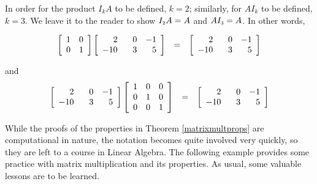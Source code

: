 In order for the product $I_{k}A$ to be defined, $k = 2$;  similarly, for $AI_{k}$ to be defined, $k = 3$.  We leave it to the reader to show $I_{\mbox{\tiny$2$}}A = A$ and $AI_{\mbox{\tiny$3$}} = A$.  In other words,


\[\begin{array}{rcl}
\left[ \begin{array}{rr} 1 & 0 \\ 0 & 1 \\ \end{array} \right] \left[\begin{array}{rrr} 2 & \hphantom{-}0 & -1 \\ -10 & 3 & 5 \\ \end{array} \right] & = & \left[\begin{array}{rrr} 2 & \hphantom{-}0 & -1 \\ -10 & 3 & 5 \\ \end{array} \right] \\ \end{array}\]

and
\[\begin{array}{rcl}
\left[\begin{array}{rrr} 2 & \hphantom{-}0 & -1 \\ -10 & 3 & 5 \\ \end{array} \right]\left[ \begin{array}{rrr} 1 & 0 & 0 \\ 0 & 1 & 0 \\ 0 & 0 & 1 \\ \end{array} \right] & = & \left[\begin{array}{rrr} 2 & \hphantom{-}0 & -1 \\ -10 & 3 & 5 \\ \end{array} \right] \\ \end{array}\]

While the proofs of the properties in Theorem \ref{matrixmultprops} are computational in nature, the notation becomes quite involved very quickly, so they are left to a course in Linear Algebra. The following example provides some practice with matrix multiplication and its properties.  As usual, some valuable lessons are to be learned.


